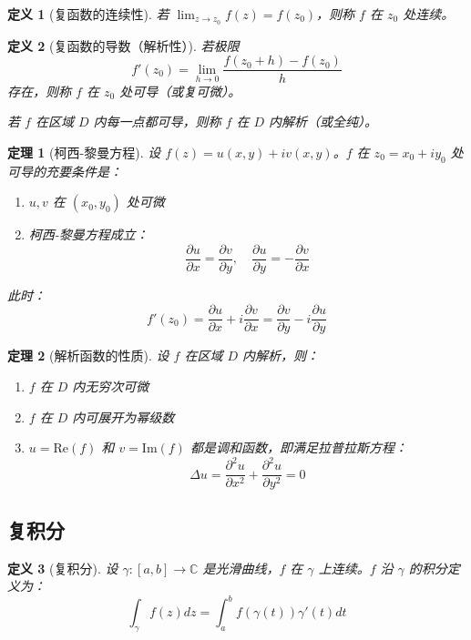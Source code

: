 \documentclass[12pt]{article}
\newtheorem{theorem}{定理}[section]
\newtheorem{definition}{定义}[section]
\begin{document}
\begin{definition}[复函数的连续性]
若 $\lim_{z \to z_0} f(z) = f(z_0)$，则称 $f$ 在 $z_0$ 处连续。
\end{definition}

\begin{definition}[复函数的导数（解析性）]
若极限
$$f'(z_0) = \lim_{h \to 0} \frac{f(z_0 + h) - f(z_0)}{h}$$
存在，则称 $f$ 在 $z_0$ 处可导（或复可微）。

若 $f$ 在区域 $D$ 内每一点都可导，则称 $f$ 在 $D$ 内解析（或全纯）。
\end{definition}

\begin{theorem}[柯西-黎曼方程]
设 $f(z) = u(x, y) + iv(x, y)$。$f$ 在 $z_0 = x_0 + iy_0$ 处可导的充要条件是：
\begin{enumerate}
\item $u, v$ 在 $(x_0, y_0)$ 处可微
\item 柯西-黎曼方程成立：
$$\frac{\partial u}{\partial x} = \frac{\partial v}{\partial y}, \quad \frac{\partial u}{\partial y} = -\frac{\partial v}{\partial x}$$
\end{enumerate}

此时：
$$f'(z_0) = \frac{\partial u}{\partial x} + i\frac{\partial v}{\partial x} = \frac{\partial v}{\partial y} - i\frac{\partial u}{\partial y}$$
\end{theorem}

\begin{theorem}[解析函数的性质]
设 $f$ 在区域 $D$ 内解析，则：
\begin{enumerate}
\item $f$ 在 $D$ 内无穷次可微
\item $f$ 在 $D$ 内可展开为幂级数
\item $u = \text{Re}(f)$ 和 $v = \text{Im}(f)$ 都是调和函数，即满足拉普拉斯方程：
$$\Delta u = \frac{\partial^2 u}{\partial x^2} + \frac{\partial^2 u}{\partial y^2} = 0$$
\end{enumerate}
\end{theorem}

\subsection{复积分}

\begin{definition}[复积分]
设 $\gamma: [a, b] \to \mathbb{C}$ 是光滑曲线，$f$ 在 $\gamma$ 上连续。$f$ 沿 $\gamma$ 的积分定义为：
$$\int_\gamma f(z) dz = \int_a^b f(\gamma(t)) \gamma'(t) dt$$
\end{definition}
\end{document}
